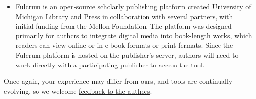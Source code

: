 \documentclass[
  english,
]{book}
\begin{document}
\begin{itemize}
\item
  \href{https://www.fulcrum.org/}{Fulcrum} is an open-source scholarly publishing platform created University of Michigan Library and Press in collaboration with several partners, with initial funding from the Mellon Foundation. The platform was designed primarily for authors to integrate digital media into book-length works, which readers can view online or in e-book formats or print formats. Since the Fulcrum platform is hosted on the publisher's server, authors will need to work directly with a participating publisher to access the tool.
\end{itemize}

Once again, your experience may differ from ours, and tools are continually evolving, so we welcome \href{authors.html}{feedback to the authors}.

\backmatter
\end{document}
